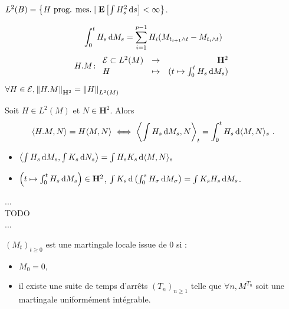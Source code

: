 \begin{rem}
	$L^2(B) = \left\{ H\ \text{prog. mes.} \mid \mathbf{E} \left[ \int H_s^2 \mathop{}\mathopen{}\mathrm{d} s \right] < \infty \right\}$.
\end{rem}

\begin{defn}
	$$\int_0^t H_s \mathop{}\mathopen{}\mathrm{d} M_s = \sum_{i = 1}^{p - 1} H_i (M_{t_{i + 1} \wedge t} - M_{t_i \wedge t})$$
	$$H.M \colon \begin{array}{lcr} \mathcal{E} \subset L^2(M) & \to & \mathbf{H}^2 \\ H & \mapsto & (t \mapsto \int_0^t H_s \mathop{}\mathopen{}\mathrm{d} M_s) \end{array}$$
\end{defn}

\begin{lem}
	$\forall H \in \mathcal{E}, \left\lVert H.M\right\rVert_{\mathbf{H}^2} = \left\lVert H\right\rVert_{L^2(M)}$
\end{lem}

\begin{thm}
	Soit $H \in L^2(M)$ et $N \in \mathbf{H}^2$.
	Alors
	$$\langle H.M, N \rangle = H \langle M,N \rangle \iff \left\langle \int H_s \mathop{}\mathopen{}\mathrm{d} M_s, N \right\rangle_t = \int_0^t H_s \mathop{}\mathopen{}\mathrm{d} \langle M,N \rangle_s\ .$$
\end{thm}

\begin{cor}
	\begin{itemize}
		\item[\textbullet] $\left\langle \int H_s \mathop{}\mathopen{}\mathrm{d} M_s, \int K_s \mathop{}\mathopen{}\mathrm{d} N_s \right\rangle = \int H_s K_s \mathop{}\mathopen{}\mathrm{d} \langle M,N \rangle_s$
		\item[\textbullet] $\left( t \mapsto \int_0^t H_s \mathop{}\mathopen{}\mathrm{d} M_s \right) \in \mathbf{H}^2$, $\int K_s \mathop{}\mathopen{}\mathrm{d} \left( \int_0^s H_\sigma \mathop{}\mathopen{}\mathrm{d} M_\sigma \right) = \int K_s H_s \mathop{}\mathopen{}\mathrm{d} M_s$.
	\end{itemize}
\end{cor}


...\\
TODO\\
...\\

\begin{defn}
	$(M_t)_{t \geq 0}$ est une martingale locale issue de 0 si :
	\begin{itemize}
		\item[\textbullet] $M_0 = 0$,
		\item[\textbullet] il existe une suite de temps d'arrêts $(T_n)_{n \geq 1}$ telle que $\forall n, M^{T_n}$ soit une martingale uniformément intégrable.
	\end{itemize}
\end{defn}

